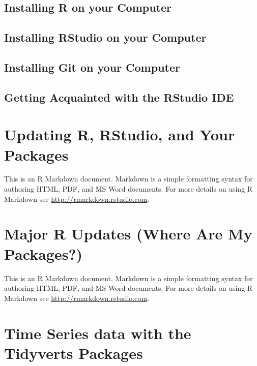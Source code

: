 \documentclass[]{book}
\begin{document}
\hypertarget{installing-r-on-your-computer}{%
\section{Installing R on your Computer}\label{installing-r-on-your-computer}}

\hypertarget{installing-rstudio-on-your-computer}{%
\section{Installing RStudio on your Computer}\label{installing-rstudio-on-your-computer}}

\hypertarget{installing-git-on-your-computer}{%
\section{Installing Git on your Computer}\label{installing-git-on-your-computer}}

\hypertarget{getting-acquainted-with-the-rstudio-ide}{%
\section{Getting Acquainted with the RStudio IDE}\label{getting-acquainted-with-the-rstudio-ide}}

\hypertarget{updating-r-rstudio-and-your-packages}{%
\chapter{Updating R, RStudio, and Your Packages}\label{updating-r-rstudio-and-your-packages}}

This is an R Markdown document. Markdown is a simple formatting syntax for authoring HTML, PDF, and MS Word documents. For more details on using R Markdown see \url{http://rmarkdown.rstudio.com}.

\hypertarget{major-r-updates-where-are-my-packages}{%
\chapter{Major R Updates (Where Are My Packages?)}\label{major-r-updates-where-are-my-packages}}

This is an R Markdown document. Markdown is a simple formatting syntax for authoring HTML, PDF, and MS Word documents. For more details on using R Markdown see \url{http://rmarkdown.rstudio.com}.

\hypertarget{time-series-data-with-the-tidyverts-packages}{%
\chapter{Time Series data with the Tidyverts Packages}\label{time-series-data-with-the-tidyverts-packages}}
\end{document}
